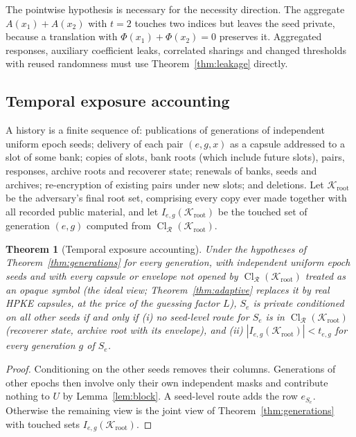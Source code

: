\documentclass[pdflatex,sn-mathphys-num]{sn-jnl}%
\theoremstyle{plain}
\newtheorem{theorem}{Theorem}
\theoremstyle{definition}
\newcommand{\Cl}{\operatorname{Cl}}
\begin{document}
The pointwise hypothesis is necessary for the necessity direction. The aggregate $A(x_1)+A(x_2)$ with $t=2$ touches two indices but leaves the seed private, because a translation with $\Phi(x_1)+\Phi(x_2)=0$ preserves it. Aggregated responses, auxiliary coefficient leaks, correlated sharings and changed thresholds with reused randomness must use Theorem~\ref{thm:leakage} directly.

\subsection{Temporal exposure accounting}
A history is a finite sequence of: publications of generations of independent uniform epoch seeds; delivery of each pair $(e,g,x)$ as a capsule addressed to a slot of some bank; copies of slots, bank roots (which include future slots), pairs, responses, archive roots and recoverer state; renewals of banks, seeds and archives; re-encryption of existing pairs under new slots; and deletions. Let $\mathcal K_{\mathrm{root}}$ be the adversary's final root set, comprising every copy ever made together with all recorded public material, and let $I_{e,g}(\mathcal K_{\mathrm{root}})$ be the touched set of generation $(e,g)$ computed from $\Cl_{\mathcal R}(\mathcal K_{\mathrm{root}})$.

\begin{theorem}[Temporal exposure accounting]\label{thm:temporal}
Under the hypotheses of Theorem~\ref{thm:generations} for every generation, with independent uniform epoch seeds and with every capsule or envelope not opened by $\Cl_{\mathcal R}(\mathcal K_{\mathrm{root}})$ treated as an opaque symbol (the ideal view; Theorem~\ref{thm:adaptive} replaces it by real HPKE capsules, at the price of the guessing factor $L$), $S_e$ is private conditioned on all other seeds if and only if (i) no seed-level route for $S_e$ is in $\Cl_{\mathcal R}(\mathcal K_{\mathrm{root}})$ (recoverer state, archive root with its envelope), and (ii) $|I_{e,g}(\mathcal K_{\mathrm{root}})|<t_{e,g}$ for every generation $g$ of $S_e$.
\end{theorem}
\begin{proof}
Conditioning on the other seeds removes their columns. Generations of other epochs then involve only their own independent masks and contribute nothing to $U$ by Lemma~\ref{lem:block}. A seed-level route adds the row $e_{S_e}$. Otherwise the remaining view is the joint view of Theorem~\ref{thm:generations} with touched sets $I_{e,g}(\mathcal K_{\mathrm{root}})$.
\end{proof}
\end{document}
